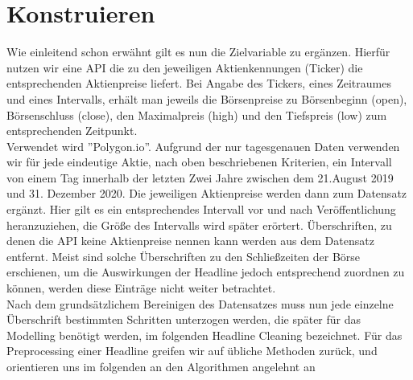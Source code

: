 \section*{Konstruieren}
Wie einleitend schon erwähnt gilt es nun die Zielvariable zu ergänzen. Hierfür nutzen wir eine API die zu den jeweiligen Aktienkennungen (Ticker) die entsprechenden Aktienpreise liefert. Bei Angabe des Tickers, eines Zeitraumes und eines Intervalls, erhält man jeweils die Börsenpreise zu Börsenbeginn (open), Börsenschluss (close), den Maximalpreis (high) und den Tiefspreis (low) zum entsprechenden Zeitpunkt. \\Verwendet wird ''Polygon.io''. Aufgrund der nur tagesgenauen Daten verwenden wir für jede eindeutige Aktie, nach oben beschriebenen Kriterien, ein Intervall von einem Tag innerhalb der letzten Zwei Jahre zwischen dem 21.August 2019 und 31. Dezember 2020. Die jeweiligen Aktienpreise werden dann zum Datensatz ergänzt. Hier gilt es ein entsprechendes Intervall vor und nach Veröffentlichung heranzuziehen, die Größe des Intervalls wird später erörtert. Überschriften, zu denen die API keine Aktienpreise nennen kann werden aus dem Datensatz entfernt. Meist sind solche Überschriften zu den Schließzeiten der Börse erschienen, um die Auswirkungen der Headline jedoch entsprechend zuordnen zu können, werden diese Einträge nicht weiter betrachtet. \\
Nach dem grundsätzlichem Bereinigen des Datensatzes muss nun jede einzelne Überschrift bestimmten Schritten unterzogen werden, die später für das Modelling benötigt werden, im folgenden Headline Cleaning bezeichnet. Für das Preprocessing einer Headline greifen wir auf übliche Methoden zurück, und orientieren uns im folgenden an den Algorithmen angelehnt an \cite{agarwel2016}\\ 

%

